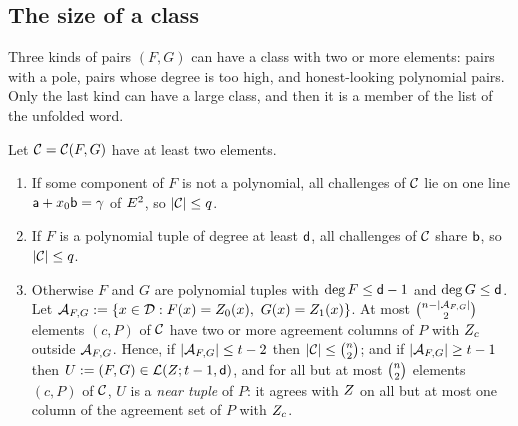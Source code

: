 \subsection{The size of a class}\label{sec:L2}

Three kinds of pairs $(F,G)$ can have a class with two or more elements: pairs with a pole, pairs whose degree is too high, and honest-looking polynomial pairs. Only the last kind can have a large class, and then it is a member of the list of the unfolded word.

\begin{lemma}\label{lem:L2}
Let $\mathcal{C}=\mathcal{C}(F,G)$ have at least two elements.
\begin{enumerate}[itemsep=1pt,topsep=2pt,label=\textnormal{(\alph*)}]
\item If some component of $F$ is not a polynomial, all challenges of $\mathcal{C}$ lie on one line $\mathsf{a}+x_0\mathsf{b}=\gamma$ of $E^2$, so $|\mathcal{C}|\le q$.
\item If $F$ is a polynomial tuple of degree at least $\mathsf{d}$, all challenges of $\mathcal{C}$ share $\mathsf{b}$, so $|\mathcal{C}|\le q$.
\item Otherwise $F$ and $G$ are polynomial tuples with $\deg F\le\mathsf{d}-1$ and $\deg G\le\mathsf{d}$. Let $\aset_{F,G}:=\{x\in\dom:F(x)=\orc_0(x),\ G(x)=\orc_1(x)\}$. At most $\binom{n-|\mathcal{A}_{F,G}|}{2}$ elements $(c,P)$ of $\mathcal{C}$ have two or more agreement columns of $P$ with $Z_c$ outside $\mathcal{A}_{F,G}$. Hence, if $|\mathcal{A}_{F,G}|\le t-2$ then $|\mathcal{C}|\le\binom{n}{2}$; and if $|\mathcal{A}_{F,G}|\ge t-1$ then $U:=(F,G)\in\mathcal{L}(Z;t-1,\mathsf{d})$, and for all but at most $\binom{n}{2}$ elements $(c,P)$ of $\mathcal{C}$, $U$ is a \emph{near tuple} of $P$: it agrees with $Z$ on all but at most one column of the agreement set of $P$ with $Z_c$.
\end{enumerate}
\end{lemma}
